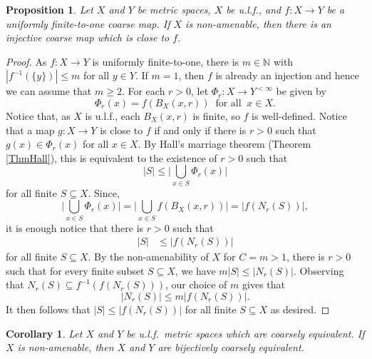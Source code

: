 \documentclass[11pt]{amsart}
\newcommand{\N}{\mathbb{N}}
\newcommand{\eps}{\varepsilon}
\numberwithin{equation}{section}
\newtheorem{proposition}[theorem]{Proposition}
\newtheorem{corollary}[theorem]{Corollary}
\theoremstyle{definition}
\theoremstyle{remark}
\newtheorem{remark}[theorem]{Remark}
\numberwithin{equation}{section}
\begin{document}
\begin{proposition}\label{PropCoarseEmbImpliesInjCNonAme}
 Let $X$ and $Y$ be metric spaces, $X$ be u.l.f., and $f\colon X\to Y$ be a uniformly finite-to-one coarse map. If $X$ is non-amenable, then there is an injective coarse map which is close to $f$. 
\end{proposition}

\begin{proof}
As $f\colon X\to Y$ is uniformly finite-to-one, there is $m\in\N$ with $|f^{-1}(\{y\})|\leq m$ for all $y\in Y$. If $m=1$, then $f$ is already an injection and hence we can assume that $m\ge 2$. For each $r>0$, let $\Phi_r \colon X \to Y^{<\infty}$ be given by 
\[
\Phi_r(x)=f(B_X(x,r))\ \text{ for all }\ x\in X.
\] 
Notice that, as $X$ is u.l.f., each $B_X(x,r)$ is finite, so $f$ is well-defined. Notice that a map $g\colon X\to Y$ is close to $f$ if and only if there is $r>0$ such that $g(x)\in\Phi_r(x)$ for all $x\in X$. By Hall's marriage theorem (Theorem \ref{ThmHall}), this is equivalent to the existence of $r>0$ such that 
\[
|S|\le \Bigg|\bigcup_{x\in S}\Phi_r(x)\Bigg|
\]
for all finite $S\subseteq X$. Since, 
\[
\Bigg|\bigcup_{x\in S}\Phi_r(x)\Bigg|=\Bigg|\bigcup_{x\in S}f(B_X(x,r))\Bigg|=|f(N_r(S))|,
\]
it is enough notice that there is $r>0$ such that 
\begin{align*} 
|S|&\le |f(N_r(S))|
\end{align*}
for all finite $S\subseteq X$. By the non-amenability of $X$ for $C=m>1$, there is $r>0$ such that for every finite subset $S\subseteq X$, we have $m |S|\le |N_{r}(S)|$. Observing that $N_r(S)\subseteq f^{-1}(f(N_r(S)))$, our choice of $m$ gives that 
\[
|N_r(S)|\le m|f(N_r(S))|.
\]
It then follows that $|S|\le |f(N_{r}(S))|$ for all finite $S\subseteq X$ as desired.
\end{proof}

 \begin{corollary}\label{ThmBijCoarseNonAme}
 Let $X$ and $Y$ be u.l.f.\ metric spaces which are coarsely equivalent. If $X$ is non-amenable, then $X$ and $Y$ are bijectively coarsely equivalent. 
\end{corollary}
\end{document}
